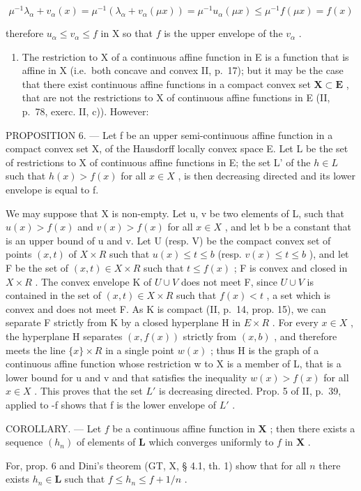 \[
\mu^ {- 1} \lambda_ {\alpha} + v _ {\alpha} (x) = \mu^ {- 1} (\lambda_ {\alpha} + v _ {\alpha} (\mu x)) = \mu^ {- 1} u _ {\alpha} (\mu x) \leqslant \mu^ {- 1} f (\mu x) = f (x)
\]

therefore \(u_{\alpha} \leqslant v_{\alpha} \leqslant f\) in X so that \(f\) is the upper envelope of the \(v_{\alpha}\) .

\begin{enumerate}
\def\labelenumi{\arabic{enumi})}
\setcounter{enumi}{2}
\tightlist
\item
  The restriction to X of a continuous affine function in E is a function that is affine in X (i.e.~both concave and convex II, p.~17); but it may be the case that there exist continuous affine functions in a compact convex set \(\mathbf{X} \subset \mathbf{E}\) , that are not the restrictions to X of continuous affine functions in E (II, p.~78, exerc. II, c)). However:
\end{enumerate}

PROPOSITION 6. --- Let f be an upper semi-continuous affine function in a compact convex set X, of the Hausdorff locally convex space E. Let L be the set of restrictions to X of continuous affine functions in E; the set L' of the \(h \in L\) such that \(h(x) > f(x)\) for all \(x \in X\) , is then decreasing directed and its lower envelope is equal to f.

We may suppose that X is non-empty. Let u, v be two elements of L, such that \(u(x) > f(x)\) and \(v(x) > f(x)\) for all \(x \in X\) , and let b be a constant that is an upper bound of u and v. Let U (resp. V) be the compact convex set of points \((x, t)\) of \(X \times R\) such that \(u(x) \leqslant t \leqslant b\) (resp. \(v(x) \leqslant t \leqslant b\) ), and let F be the set of \((x, t) \in X \times R\) such that \(t \leqslant f(x)\) ; F is convex and closed in \(X \times R\) . The convex envelope K of \(U \cup V\) does not meet F, since \(U \cup V\) is contained in the set of \((x, t) \in X \times R\) such that \(f(x) < t\) , a set which is convex and does not meet F. As K is compact (II, p.~14, prop. 15), we can separate F strictly from K by a closed hyperplane H in \(E \times R\) . For every \(x \in X\) , the hyperplane H separates \((x, f(x))\) strictly from \((x, b)\) , and therefore meets the line \(\{x\} \times R\) in a single point \(w(x)\) ; thus H is the graph of a continuous affine function whose restriction w to X is a member of L, that is a lower bound for u and v and that satisfies the inequality \(w(x) > f(x)\) for all \(x \in X\) . This proves that the set \(L'\) is decreasing directed. Prop. 5 of II, p.~39, applied to -f shows that f is the lower envelope of \(L'\) .

COROLLARY. --- Let \(f\) be a continuous affine function in \(\mathbf{X}\) ; then there exists a sequence \((h_n)\) of elements of \(\mathbf{L}\) which converges uniformly to \(f\) in \(\mathbf{X}\) .

For, prop. 6 and Dini's theorem (GT, X, § 4.1, th. 1) show that for all \(n\) there exists \(h_n \in \mathbf{L}\) such that \(f \leqslant h_n \leqslant f + 1/n\) .

